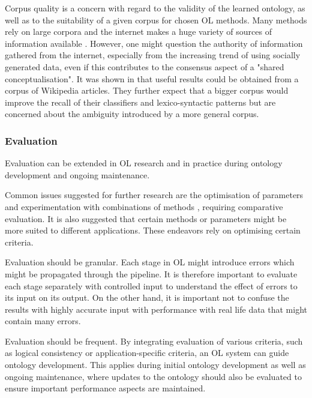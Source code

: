 \documentclass[a4paper]{report}
\begin{document}
Corpus quality is a concern with regard to the validity of the learned ontology, as well as to the suitability of a given corpus for chosen OL methods.
Many methods rely on large corpora\cite{Cimiano06} and the internet makes a huge variety of sources of information available \cite{Wong11Survey}.
However, one might question the authority of information gathered from the internet, especially from the increasing trend of using socially generated data, even if this contributes to the consensus aspect of a "shared conceptualisation"\cite{Wong11Survey}.
It was shown in \cite{Hjelm09Thesis} that useful results could be obtained from a corpus of Wikipedia articles.
They further expect that a bigger corpus would improve the recall of their classifiers and lexico-syntactic patterns but are concerned about the ambiguity introduced by a more general corpus\cite{Hjelm09Thesis}. 

\subsubsection{Evaluation}

Evaluation can be extended in OL research and in practice during ontology development and ongoing maintenance.

Common issues suggested for further research are the optimisation of parameters \cite{Hjelm09Thesis} and experimentation with combinations of methods \cite{Cimiano2005Text2Onto,Zouaq11OntoCmaps}, requiring comparative evaluation.
It is also suggested that certain methods or parameters might be more suited to different applications\cite{Gulla08LOUIE, Cimiano06}.
These endeavors rely on optimising certain criteria\cite{Cimiano2009OL}.

Evaluation should be granular.
Each stage in OL might introduce errors which might be propagated through the pipeline\cite{Zouaq11OntoCmaps, Hjelm09Thesis}.
It is therefore important to evaluate each stage separately with controlled input to understand  the effect of errors to its input on its output.
On the other hand, it is important not to confuse the results with highly accurate input with performance with real life data that might contain many errors.

Evaluation should be frequent.
By integrating evaluation of various criteria, such as logical consistency or application-specific criteria, an OL system can guide ontology development\cite{Cimiano2009OL}.
This applies during initial ontology development as well as ongoing maintenance, where updates to the ontology should also be evaluated to ensure important performance aspects are maintained\cite{HOO2009OntEngMeth}.
\end{document}
